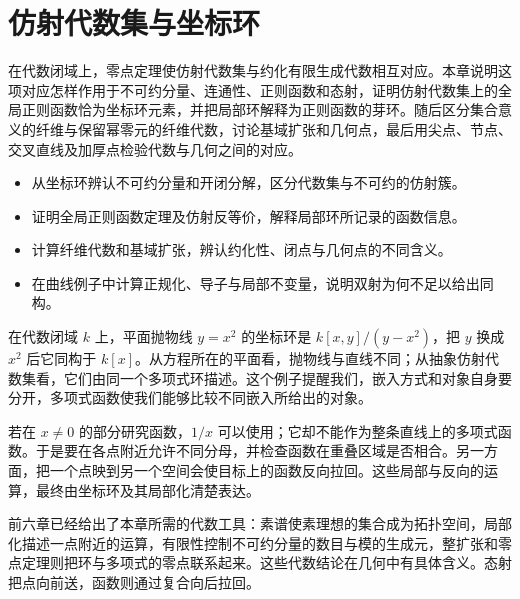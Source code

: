 

\chapter{仿射代数集与坐标环}
\label{b3:ch:07}

\begin{chapterabstract}
	在代数闭域上，零点定理使仿射代数集与约化有限生成代数相互对应。本章说明这项对应怎样作用于不可约分量、连通性、正则函数和态射，证明仿射代数集上的全局正则函数恰为坐标环元素，并把局部环解释为正则函数的芽环。随后区分集合意义的纤维与保留幂零元的纤维代数，讨论基域扩张和几何点，最后用尖点、节点、交叉直线及加厚点检验代数与几何之间的对应。
\end{chapterabstract}

\begin{learninggoals}
	\begin{itemize}
		\item 从坐标环辨认不可约分量和开闭分解，区分代数集与不可约的仿射簇。
		\item 证明全局正则函数定理及仿射反等价，解释局部环所记录的函数信息。
		\item 计算纤维代数和基域扩张，辨认约化性、闭点与几何点的不同含义。
		\item 在曲线例子中计算正规化、导子与局部不变量，说明双射为何不足以给出同构。
	\end{itemize}
\end{learninggoals}

在代数闭域 \(k\) 上，平面抛物线 \(y=x^2\) 的坐标环是 \(k[x,y]/(y-x^2)\)，把 \(y\) 换成 \(x^2\) 后它同构于 \(k[x]\)。从方程所在的平面看，抛物线与直线不同；从抽象仿射代数集看，它们由同一个多项式环描述。这个例子提醒我们，嵌入方式和对象自身要分开，多项式函数使我们能够比较不同嵌入所给出的对象。

\ProseParagraphBreak

若在 \(x\ne0\) 的部分研究函数，\(1/x\) 可以使用；它却不能作为整条直线上的多项式函数。于是要在各点附近允许不同分母，并检查函数在重叠区域是否相合。另一方面，把一个点映到另一个空间会使目标上的函数反向拉回。这些局部与反向的运算，最终由坐标环及其局部化清楚表达。

\ProseParagraphBreak

前六章已经给出了本章所需的代数工具：素谱使素理想的集合成为拓扑空间，局部化描述一点附近的运算，有限性控制不可约分量的数目与模的生成元，整扩张和零点定理则把环与多项式的零点联系起来。这些代数结论在几何中有具体含义。态射把点向前送，函数则通过复合向后拉回。

